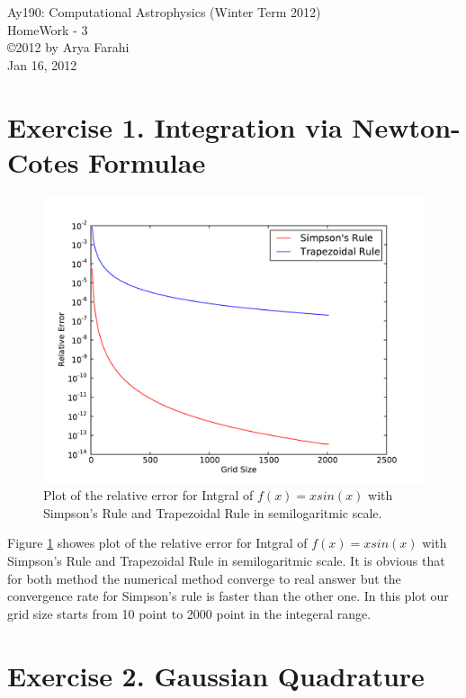 \documentclass[10pt]{article}
\begin{document}
\begin{center}
{\large Ay190: Computational Astrophysics (Winter Term 2012)} \\
{\large HomeWork - 3 } \\
\copyright 2012 by Arya Farahi \\
Jan 16, 2012
\end{center}

\section{Exercise 1. Integration via Newton-Cotes Formulae}

\begin{figure}[hbt]
  \begin{center}
    \includegraphics[scale=0.7]{Plot/plot1.pdf}
    \caption{\label{fig:RelErr} Plot of the relative error for Intgral of $ f(x)=x sin(x) $ with Simpson's Rule and Trapezoidal Rule in semilogaritmic scale.}
  \end{center}
\end{figure}

Figure \ref{fig:RelErr} showes plot of the relative error for Intgral of $ f(x)=x sin(x) $ with Simpson's Rule and Trapezoidal Rule in semilogaritmic scale. It is obvious that for both method the numerical method converge to real answer but the convergence rate for Simpson's rule is faster than the other one. In this plot our grid size starts from 10 point to 2000 point in the integeral range. \\

\section{Exercise 2. Gaussian Quadrature}
\end{document}
